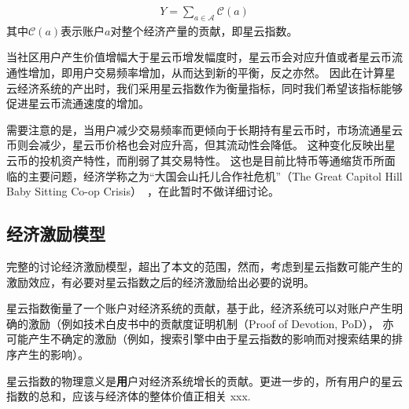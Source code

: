 \begin{align}
Y=\sum_{a\in \mathcal{A}} \mathcal{C}(a)
\end{align}
\noindent 其中$\mathcal{C}(a)$表示账户$a$对整个经济产量的贡献，即星云指数。


当社区用户产生价值增幅大于星云币增发幅度时，星云币会对应升值或者星云币流通性增加，即用户交易频率增加，从而达到新的平衡，反之亦然。
因此在计算星云经济系统的产出时，我们采用星云指数作为衡量指标，同时我们希望该指标能够促进星云币流通速度的增加。

需要注意的是，当用户减少交易频率而更倾向于长期持有星云币时，市场流通星云币则会减少，星云币价格也会对应升高，但其流动性会降低。
这种变化反映出星云币的投机资产特性，而削弱了其交易特性。
这也是目前比特币等通缩货币所面临的主要问题，经济学称之为“大国会山托儿合作社危机”（The Great Capitol Hill Baby Sitting Co-op Crisis）~\cite{hens2007great}，在此暂时不做详细讨论。


\subsection{经济激励模型}
完整的讨论经济激励模型，超出了本文的范围，然而，考虑到星云指数可能产生的激励效应，有必要对星云指数之后的经济激励给出必要的说明。

星云指数衡量了一个账户对经济系统的贡献，基于此，经济系统可以对账户产生明确的激励（例如技术白皮书中的贡献度证明机制（Proof of Devotion, PoD），
亦可能产生不确定的激励（例如，搜索引擎中由于星云指数的影响而对搜索结果的排序产生的影响）。

星云指数的物理意义是{\textbf 用户对经济系统增长的贡献}。更进一步的，所有用户的星云指数的总和，应该与经济体的整体价值正相关{\color{red} xxx}.
